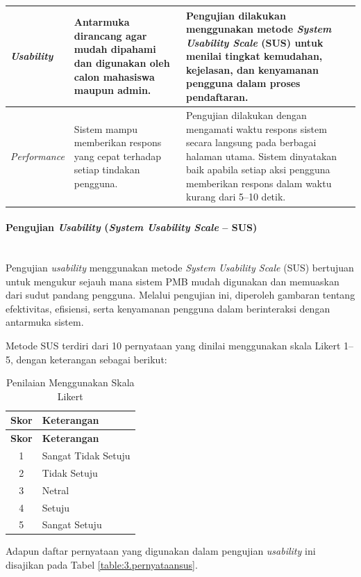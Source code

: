 \begin{longtable}{|p{}|p{}|p{}|}
	\hline
	\textit{Usability} & Antarmuka dirancang agar mudah dipahami dan digunakan oleh calon mahasiswa maupun admin. & Pengujian dilakukan menggunakan metode \textit{System Usability Scale} (SUS) untuk menilai tingkat kemudahan, kejelasan, dan kenyamanan pengguna dalam proses pendaftaran. \\
	\hline
	\textit{Performance} & Sistem mampu memberikan respons yang cepat terhadap setiap tindakan pengguna. & Pengujian dilakukan dengan mengamati waktu respons sistem secara langsung pada berbagai halaman utama. Sistem dinyatakan baik apabila setiap aksi pengguna memberikan respons dalam waktu kurang dari 5--10 detik. \\
	\hline
\end{longtable}

\paragraph{Pengujian \textit{Usability} (\textit{System Usability Scale} -- SUS)}~\\
Pengujian \textit{usability} menggunakan metode \textit{System Usability Scale} (SUS) bertujuan untuk mengukur sejauh mana sistem PMB mudah digunakan dan memuaskan dari sudut pandang pengguna. Melalui pengujian ini, diperoleh gambaran tentang efektivitas, efisiensi, serta kenyamanan pengguna dalam berinteraksi dengan antarmuka sistem.\par

Metode SUS terdiri dari 10 pernyataan yang dinilai menggunakan skala Likert 1--5, dengan keterangan sebagai berikut:\par

\begin{longtable}{|c|p{}|}
	\caption{Penilaian Menggunakan Skala Likert}
	\label{table:3.skalalikert}\\
	\hline
	\textbf{Skor} & \textbf{Keterangan} \\
	\hline
	\endfirsthead
	\hline
	\textbf{Skor} & \textbf{Keterangan} \\
	\hline
	\endhead
	1 & Sangat Tidak Setuju \\
	\hline
	2 & Tidak Setuju \\
	\hline
	3 & Netral \\
	\hline
	4 & Setuju \\
	\hline
	5 & Sangat Setuju \\
	\hline
\end{longtable}

Adapun daftar pernyataan yang digunakan dalam pengujian \textit{usability} ini disajikan pada Tabel \ref{table:3.pernyataansus}.\par

